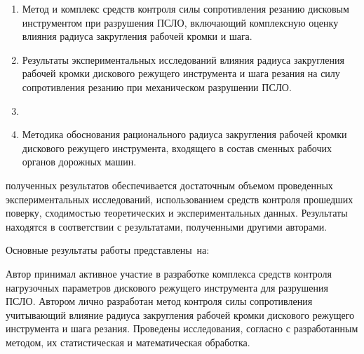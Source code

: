 {}
\begin{enumerate}
  \item Метод и комплекс средств контроля силы сопротивления резанию дисковым инструментом при разрушения ПСЛО, включающий комплексную оценку влияния радиуса закругления рабочей кромки и шага.
  \item Результаты экспериментальных исследований влияния радиуса закругления рабочей кромки дискового режущего инструмента и шага резания на силу сопротивления резанию при механическом разрушении ПСЛО.
  \item {}
  \item Методика обоснования рационального радиуса закругления рабочей кромки дискового режущего инструмента, входящего в состав сменных рабочих органов дорожных машин.
\end{enumerate}

{\reliability} полученных результатов обеспечивается достаточным объемом проведенных экспериментальных исследований, использованием средств контроля прошедших поверку, сходимостью теоретических и экспериментальных данных. Результаты находятся в соответствии с результатами, полученными другими авторами.


{\probation} Основные результаты работы представлены~на: 

{\contribution} Автор принимал активное участие в разработке комплекса средств контроля нагрузочных параметров дискового режущего инструмента для разрушения ПСЛО. Автором лично разработан метод контроля силы сопротивления учитывающий влияние радиуса закругления рабочей кромки дискового режущего инструмента и шага резания. Проведены исследования, согласно с разработанным методом, их статистическая и математическая обработка.  


